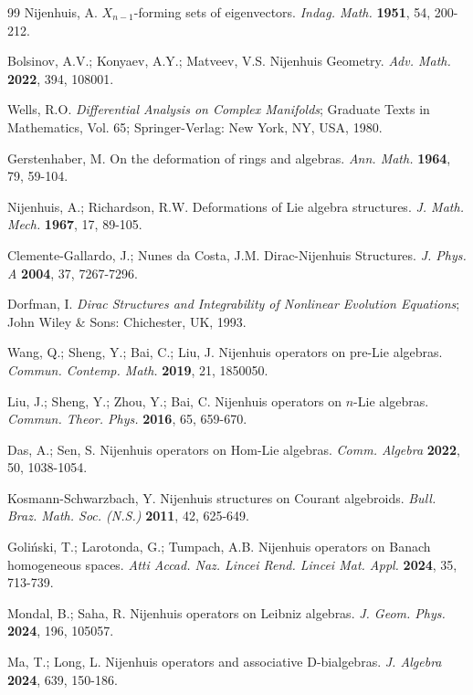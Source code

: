 \documentclass[12pt, reqno]{amsart}
\theoremstyle{plain}
\begin{document}
\begin{thebibliography}{99}
 Nijenhuis, A. $X_{n-1}$-forming sets of eigenvectors. \emph{Indag. Math.} \textbf{1951}, 54, 200-212.

 Bolsinov, A.V.; Konyaev, A.Y.; Matveev, V.S. Nijenhuis Geometry. \emph{Adv. Math.} \textbf{2022}, 394, 108001.

 Wells, R.O. \emph{Differential Analysis on Complex Manifolds}; Graduate Texts in Mathematics, Vol. 65; Springer-Verlag: New York, NY, USA, 1980.

 Gerstenhaber, M. On the deformation of rings and algebras. \emph{Ann. Math.} \textbf{1964}, 79, 59-104.

 Nijenhuis, A.; Richardson, R.W. Deformations of Lie algebra structures. \emph{J. Math. Mech.} \textbf{1967}, 17, 89-105.

 Clemente-Gallardo, J.; Nunes da Costa, J.M. Dirac-Nijenhuis Structures. \emph{J. Phys. A} \textbf{2004}, 37, 7267-7296.

 Dorfman, I. \emph{Dirac Structures and Integrability of Nonlinear Evolution Equations}; John Wiley \& Sons: Chichester, UK, 1993. %

 Wang, Q.; Sheng, Y.; Bai, C.; Liu, J. Nijenhuis operators on pre-Lie algebras. \emph{Commun. Contemp. Math.} \textbf{2019}, 21, 1850050.

 Liu, J.; Sheng, Y.; Zhou, Y.; Bai, C. Nijenhuis operators on $n$-Lie algebras. \emph{Commun. Theor. Phys.} \textbf{2016}, 65, 659-670.

 Das, A.; Sen, S. Nijenhuis operators on Hom-Lie algebras. \emph{Comm. Algebra} \textbf{2022}, 50, 1038-1054.

 Kosmann-Schwarzbach, Y. Nijenhuis structures on Courant algebroids. \emph{Bull. Braz. Math. Soc. (N.S.)} \textbf{2011}, 42, 625-649.

 Goli\'nski, T.; Larotonda, G.; Tumpach, A.B. Nijenhuis operators on Banach homogeneous spaces. \emph{Atti Accad. Naz. Lincei Rend. Lincei Mat. Appl.} \textbf{2024}, 35, 713-739.

 Mondal, B.; Saha, R. Nijenhuis operators on Leibniz algebras. \emph{J. Geom. Phys.} \textbf{2024}, 196, 105057.

 Ma, T.; Long, L. Nijenhuis operators and associative D-bialgebras. \emph{J. Algebra} \textbf{2024}, 639, 150-186.


\end{thebibliography}
\end{document}
